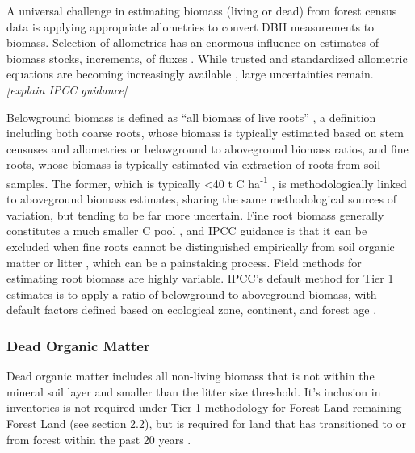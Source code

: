 \documentclass[, manuscript]{copernicus}
\begin{document}
A universal challenge in estimating biomass (living or dead) from forest
census data is applying appropriate allometries to convert DBH
measurements to biomass. Selection of allometries has an enormous
influence on estimates of biomass stocks, increments, of fluxes
\citep{clark_landscapescale_2000, clark_net_2001}. While trusted and
standardized allometric equations are becoming increasingly available
\citep{chave_improved_2014, rejou-mechain_biomass_2017, gonzalez-akre_allodb_2022},
large uncertainties remain. \emph{{[}explain IPCC guidance{]}}

Belowground biomass is defined as ``all biomass of live roots''
\citep{ipcc_good_2003, ipcc_2006_2006}, a definition including both
coarse roots, whose biomass is typically estimated based on stem
censuses and allometries or belowground to aboveground biomass ratios,
and fine roots, whose biomass is typically estimated via extraction of
roots from soil samples. The former, which is typically \textless40 t C
ha\textsuperscript{-1} \citep{anderson-teixeira_carbon_2021}, is
methodologically linked to aboveground biomass estimates, sharing the
same methodological sources of variation, but tending to be far more
uncertain. Fine root biomass generally constitutes a much smaller C pool
\citep[typically \textless5 t C
ha\textsuperscript{-1},][]{anderson-teixeira_carbon_2021}, and IPCC
guidance is that it can be excluded when fine roots cannot be
distinguished empirically from soil organic matter or litter
\citep{ipcc_2006_2006}, which can be a painstaking process. Field
methods for estimating root biomass are highly variable. IPCC's default
method for Tier 1 estimates is to apply a ratio of belowground to
aboveground biomass, with default factors defined based on ecological
zone, continent, and forest age \citep{ipcc_2006_2006, ipcc_2019_2019}.

\subsubsection{Dead Organic Matter}

Dead organic matter includes all non-living biomass that is not within
the mineral soil layer and smaller than the litter size threshold. It's
inclusion in inventories is not required under Tier 1 methodology for
Forest Land remaining Forest Land (see section 2.2), but is required for
land that has transitioned to or from forest within the past 20 years
\citep{ipcc_2006_2006}.
\end{document}
